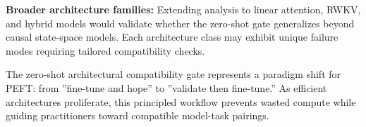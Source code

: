 \textbf{Broader architecture families:} Extending analysis to linear attention, RWKV, and hybrid models would validate whether the zero-shot gate generalizes beyond causal state-space models. Each architecture class may exhibit unique failure modes requiring tailored compatibility checks.

The zero-shot architectural compatibility gate represents a paradigm shift for PEFT: from ''fine-tune and hope'' to ''validate then fine-tune.'' As efficient architectures proliferate, this principled workflow prevents wasted compute while guiding practitioners toward compatible model-task pairings.
